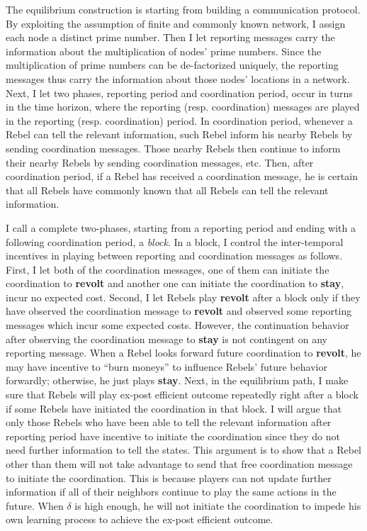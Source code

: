 \documentclass[12pt,letter]{article}
\theoremstyle{definition}
\theoremstyle{remark}
\theoremstyle{claim}
\begin{document}
The equilibrium construction is starting from building a communication protocol. By exploiting the assumption of finite and commonly known network, I assign each node a distinct prime number. Then I let reporting messages carry the information about the multiplication of nodes' prime numbers. Since the multiplication of prime numbers can be de-factorized uniquely, the reporting messages thus carry the information about those nodes' locations in a network. Next, I let two phases, reporting period and coordination period, occur in turns in the time horizon, where the reporting (resp. coordination) messages are played in the reporting (resp. coordination) period. In coordination period, whenever a Rebel can tell the relevant information, such Rebel inform his nearby Rebels by sending coordination messages. Those nearby Rebels then continue to inform their nearby Rebels by sending coordination messages, etc. Then, after coordination period, if a Rebel has received a coordination message, he is certain that all Rebels have commonly known that all Rebels can tell the relevant information. 

I call a complete two-phases, starting from a reporting period and ending with a following coordination period, a \textit{block}.  In a block, I control the inter-temporal incentives in playing between reporting and coordination messages as follows. First, I let both of the coordination messages, one of them can initiate the coordination to \textbf{revolt} and another one can initiate the coordination to \textbf{stay}, incur no expected cost. Second, I let Rebels play \textbf{revolt} after a block only if they have observed the coordination message to \textbf{revolt} and observed some reporting messages  which incur some expected costs. However, the continuation behavior after observing the coordination message to \textbf{stay} is not contingent on any reporting message. When a Rebel looks forward future coordination to \textbf{revolt}, he may have incentive to ``burn moneys'' to influence Rebels' future behavior forwardly; otherwise, he just plays \textbf{stay}. Next, in the equilibrium path, I make sure that Rebels will play ex-post efficient outcome repeatedly right after a block if some Rebels have initiated the coordination in that block. I will argue that only those Rebels who have been able to tell the relevant information after reporting period have incentive to initiate the coordination since they do not need further information to tell the states. This argument is to show that a Rebel other than them will not take advantage to send that free coordination message to initiate the coordination. This is because players can not update further information if all of their neighbors continue to play the same actions in the future. When $\delta$ is high enough, he will not initiate the coordination to impede his own learning process to achieve the ex-post efficient outcome.
\end{document}
